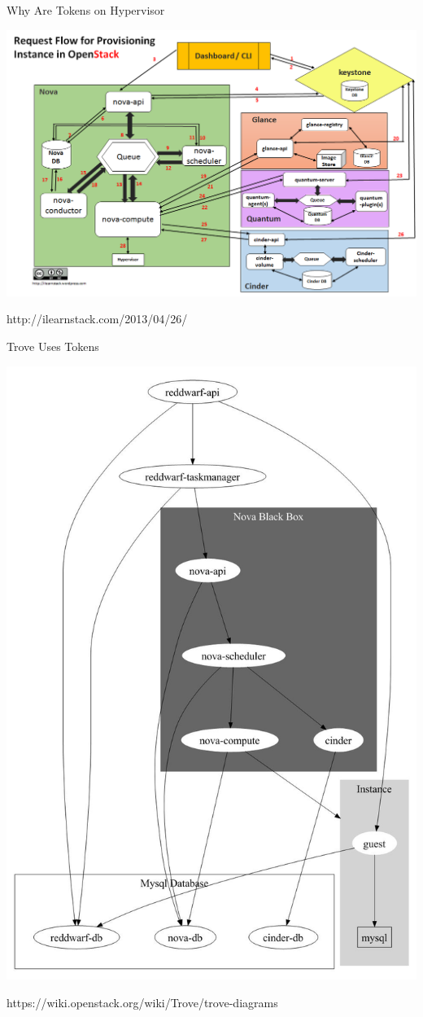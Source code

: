 \documentclass{beamer}
\begin{document}
\begin{frame}{Why Are Tokens on Hypervisor}
  \begin{block}{}
    \includegraphics[scale=0.3]{request-flow1.png}
  \end{block}
  http://ilearnstack.com/2013/04/26/
\end {frame}

\begin{frame}{Trove Uses Tokens}
  \begin{block}{}
    \includegraphics[scale=0.2]{Reddwarf-overview.jpeg}
  \end{block}
  https://wiki.openstack.org/wiki/Trove/trove-diagrams
\end {frame}
\end{document}
